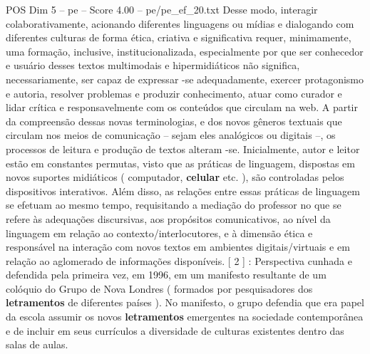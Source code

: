 \begin{textsample}{POS Dim 5 – pe – Score 4.00 – pe/pe\_ef\_20.txt}
Desse modo, interagir colaborativamente, acionando diferentes linguagens ou mídias e dialogando com diferentes culturas de forma ética, criativa e significativa requer, minimamente, uma formação, inclusive, institucionalizada, especialmente por que ser conhecedor e usuário desses textos multimodais e hipermidiáticos não significa, necessariamente, ser capaz de expressar -se adequadamente, exercer protagonismo e autoria, resolver problemas e produzir conhecimento, atuar como curador e lidar crítica e responsavelmente com os conteúdos que circulam na web.
A partir da compreensão dessas novas terminologias, e dos novos gêneros textuais que circulam nos meios de comunicação – sejam eles analógicos ou digitais –, os processos de leitura e produção de textos alteram -se.
Inicialmente, autor e leitor estão em constantes permutas, visto que as práticas de linguagem, dispostas em novos suportes midiáticos ( computador, \textbf{celular} etc. ), são controladas pelos dispositivos interativos.
Além disso, as relações entre essas práticas de linguagem se efetuam ao mesmo tempo, requisitando a mediação do professor no que se refere às adequações discursivas, aos propósitos comunicativos, ao nível da linguagem em relação ao contexto/interlocutores, e à dimensão ética e responsável na interação com novos textos em ambientes digitais/virtuais e em relação ao aglomerado de informações disponíveis. [ 2 ] : Perspectiva cunhada e defendida pela primeira vez, em 1996, em um manifesto resultante de um colóquio do Grupo de Nova Londres ( formados por pesquisadores dos \textbf{letramentos} de diferentes países ).
No manifesto, o grupo defendia que era papel da escola assumir os novos \textbf{letramentos} emergentes na sociedade contemporânea e de incluir em seus currículos a diversidade de culturas existentes dentro das salas de aulas.

\end{textsample}
